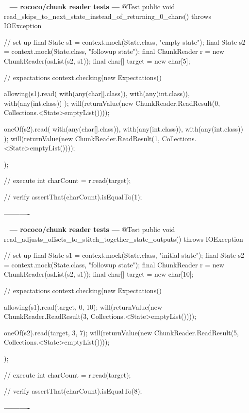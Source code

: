 \documentclass{book}
\newenvironment{chunk}[1]{%
{\ }\newline\noindent%
\hbox{\hskip 2.0cm}{\bf --- #1 ---}%
\verbatim}%                               say exactly what we see
{\endverbatim%
\par{}%
\noindent{}%
\hbox{\hskip 2.0cm}{\bf ----------}%
\par%
\normalsize\noindent}%
\begin{document}
\begin{chunk}{rococo/chunk reader tests}
@Test
public void read_skips_to_next_state_instead_of_returning_0_chars() throws IOException {
    // set up
    final State s1 = context.mock(State.class, "empty state");
    final State s2 = context.mock(State.class, "followup state");
    final ChunkReader r = new ChunkReader(asList(s2, s1));
    final char[] target = new char[5];

    // expectations
    context.checking(new Expectations() {{
        allowing(s1).read(
                with(any(char[].class)), 
                with(any(int.class)), 
                with(any(int.class))
        );
        will(returnValue(new ChunkReader.ReadResult(0, Collections.<State>emptyList())));

        oneOf(s2).read(
                with(any(char[].class)), 
                with(any(int.class)), 
                with(any(int.class))
        );
        will(returnValue(new ChunkReader.ReadResult(1, Collections.<State>emptyList())));
    }});

    // execute
    int charCount = r.read(target);

    // verify
    assertThat(charCount).isEqualTo(1);
}
\end{chunk}

\begin{chunk}{rococo/chunk reader tests}
@Test
public void read_adjusts_offsets_to_stitch_together_state_outputs() throws IOException {
    // set up
    final State s1 = context.mock(State.class, "initial state");
    final State s2 = context.mock(State.class, "followup state");
    final ChunkReader r = new ChunkReader(asList(s2, s1));
    final char[] target = new char[10];

    // expectations
    context.checking(new Expectations() {{
        allowing(s1).read(target, 0, 10);
        will(returnValue(new ChunkReader.ReadResult(3, Collections.<State>emptyList())));

        oneOf(s2).read(target, 3, 7);
        will(returnValue(new ChunkReader.ReadResult(5, Collections.<State>emptyList())));
    }});

    // execute
    int charCount = r.read(target);

    // verify
    assertThat(charCount).isEqualTo(8);
}
\end{chunk}
\end{document}
